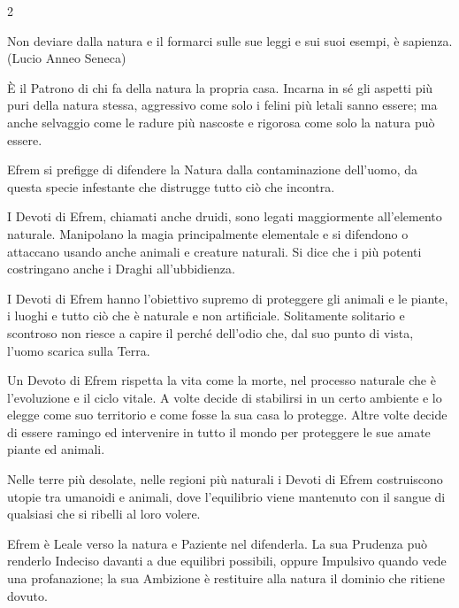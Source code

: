 \begin{multicols}{2}
\begin{enfasi}{
Non deviare dalla natura e il formarci sulle sue leggi e sui suoi esempi, è sapienza. (Lucio Anneo Seneca)
}\end{enfasi}

È il Patrono di chi fa della natura la propria casa. Incarna in sé gli aspetti più puri della natura stessa, aggressivo come solo i felini più letali sanno essere; ma anche selvaggio come le radure più nascoste e rigorosa come solo la natura può essere.

Efrem si prefigge di difendere la Natura dalla contaminazione dell'uomo, da questa specie infestante che distrugge tutto ciò che incontra.

I Devoti di Efrem, chiamati anche druidi, sono legati maggiormente all'elemento naturale. Manipolano la magia principalmente elementale e si difendono o attaccano usando anche animali e creature naturali. Si dice che i più potenti costringano anche i Draghi all'ubbidienza.

I Devoti di Efrem hanno l'obiettivo supremo di proteggere gli animali e le piante, i luoghi e tutto ciò che è naturale e non artificiale. Solitamente solitario e scontroso non riesce a capire il perché dell'odio che, dal suo punto di vista, l'uomo scarica sulla Terra.

Un Devoto di Efrem rispetta la vita come la morte, nel processo naturale che è l'evoluzione e il ciclo vitale. A volte decide di stabilirsi in un certo ambiente e lo elegge come suo territorio e come fosse la sua casa lo protegge. Altre volte decide di essere ramingo ed intervenire in tutto il mondo per proteggere le sue amate piante ed animali.

Nelle terre più desolate, nelle regioni più naturali i Devoti di Efrem costruiscono utopie tra umanoidi e animali, dove l'equilibrio viene mantenuto con il sangue di qualsiasi che si ribelli al loro volere.

Efrem è Leale verso la natura e Paziente nel difenderla. La sua Prudenza può renderlo Indeciso davanti a due equilibri possibili, oppure Impulsivo quando vede una profanazione; la sua Ambizione è restituire alla natura il dominio che ritiene dovuto.


\end{multicols}
